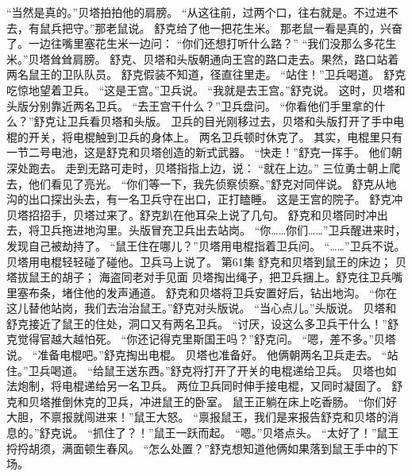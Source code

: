 \documentclass[a4paper,12pt,UTF8,twoside]{ctexbook}
\begin{document}
        “当然是真的。”贝塔拍拍他的肩膀。 
        “从这往前，过两个口，往右就是。不过进不去，有鼠兵把守。”那老鼠说。 
        舒克给了他一把花生米。 
        那老鼠一看是真的，兴奋了。一边往嘴里塞花生米一边问： 
        “你们还想打听什么路？” 
        “我们没那么多花生米。”贝塔耸耸肩膀。 
        舒克、贝塔和头版朝通向王宫的路口走去。果然，路口站着两名鼠王的卫队队员。 
        舒克假装不知道，径直往里走。 
        “站住！”卫兵喝道。 
        舒克吃惊地望着卫兵。 
        “这是王宫。”卫兵说。 
        “我就是去王宫。”舒克说。 
        这时，贝塔和头版分别靠近两名卫兵。 
        “去王宫干什么？”卫兵盘问。 
        “你看他们手里拿的什么？”舒克让卫兵看贝塔和头版。 
        卫兵的目光刚移过去，贝塔和头版打开了手中电棍的开关，将电棍触到卫兵的身体上。 
        两名卫兵顿时休克了。 
        其实，电棍里只有一节二号电池，这是舒克和贝塔创造的新式武器。 
        “快走！”舒克一挥手。 
        他们朝深处跑去。 
        走到无路可走时，贝塔指指上边，说： 
        “就在上边。” 
        三位勇士朝上爬去，他们看见了亮光。 
        “你们等一下，我先侦察侦察。”舒克对同伴说。 
        舒克从地沟的出口探出头去，有一名卫兵守在出口，正打瞌睡。 
        这是王宫的院子。 
        舒克冲贝塔招招手，贝塔过来了。舒克趴在他耳朵上说了几句。 
        舒克和贝塔同时冲出去，将卫兵拖进地沟里。头版冒充卫兵出去站岗。 
        “你……你们……”卫兵醒进来时，发现自己被劫持了。 
        “鼠王住在哪儿？”贝塔用电棍指着卫兵问。 
        “……”卫兵不说。 
        贝塔用电棍轻轻碰了碰他。卫兵马上说了。   第61集 
        舒克和贝塔到鼠王的床边； 
        贝塔拔鼠王的胡子； 
        海盗同老对手见面   
        贝塔掏出绳子，把卫兵捆上。舒克往卫兵嘴里塞布条，堵住他的发声通道。 
        舒克和贝塔将卫兵安置好后，钻出地沟。 
        “你在这儿替他站岗，我们去治治鼠王。”舒克对头版说。 
        “当心点儿。”头版说。 
        贝塔和舒克接近了鼠王的住处，洞口又有两名卫兵。 
        “讨厌，设这么多卫兵干什么！”舒克觉得官越大越怕死。 
        “你还记得克里斯国王吗？”舒克问。 
        “嗯，差不多。”贝塔说。 
        “准备电棍吧。”舒克掏出电棍。 
        贝塔也准备好。 
        他俩朝两名卫兵走去。 
        “站住。”卫兵喝道。 
        “给鼠王送东西。”舒克将打开了开关的电棍递给卫兵。 
        贝塔也如法炮制，将电棍递给另一名卫兵。 
        两位卫兵同时伸手接电棍，又同时凝固了。 
        舒克和贝塔推倒休克的卫兵，冲进鼠王的卧室。 
        鼠王正躺在床上吃香肠。 
        “你们好大胆，不禀报就闯进来！”鼠王大怒。 
        “禀报鼠王，我们是来报告舒克和贝塔的消息的。”舒克说。 
        “抓住了？！”鼠王一跃而起。 
        “嗯。”贝塔点头。 
        “太好了！”鼠王捋捋胡须，满面顿生春风。 
        “怎么处置？”舒克想知道他俩如果落到鼠王手中的下场。 
\end{document}
